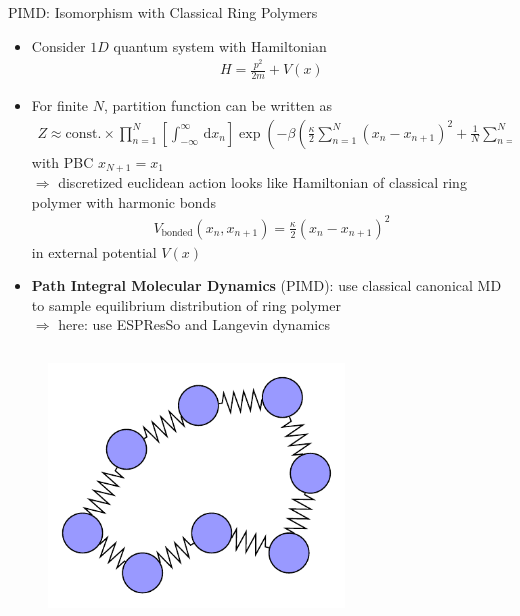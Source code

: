 \documentclass[final,hyperref={pdfpagelabels=false}]{beamer}
\begin{document}
\begin{frame}[t]
\begin{columns}[t]
\begin{column}{.48\textwidth}
\begin{block}{PIMD: Isomorphism with Classical Ring Polymers}
\begin{itemize}
\item Consider $1D$ quantum system with Hamiltonian
\begin{align*}
	H = \frac{p^2}{2m} + V(x)
\end{align*}
\item For finite $N$, partition function can be written as
\begin{align*}
Z \approx\text{const.}\times \prod_{n=1}^{N}\left[\int_{-\infty}^{\infty}\,\text{d}x_n\right] \exp\left(-\beta\left(\frac{\kappa}{2}\sum_{n=1}^N\left(x_n-x_{n+1}\right)^2+\frac{1}{N}\sum_{n=1}^NV(x_n)\right)\right)
\end{align*}
with PBC $x_{N+1}=x_1$\\
$\Rightarrow$ discretized euclidean action looks like Hamiltonian of classical ring polymer with harmonic bonds
\begin{align*}
V_{\text{bonded}}(x_n, x_{n+1})=\frac{\kappa}{2}\left(x_n-x_{n+1}\right)^2
\end{align*}
in external potential $V(x)$
\item \textbf{Path Integral Molecular Dynamics} (PIMD): use classical canonical MD to sample equilibrium distribution of ring polymer\\
$\Rightarrow$ here: use ESPResSo and Langevin dynamics
\end{itemize}

\begin{columns}[T,onlytextwidth]
\begin{figure}[H]
\centering
\includegraphics[width=0.7\textwidth]{figures/cg_schematic_neutral/cg_schematic_neutral.pdf}
\end{figure}


\end{columns}
\end{block}
\end{column}
\end{columns}
\end{frame}
\end{document}
